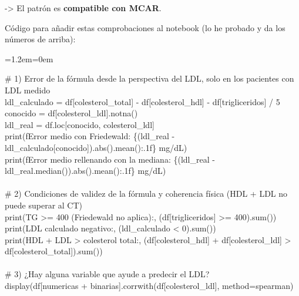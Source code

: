 \documentclass[11pt,a4paper]{article}
\newenvironment{codigo}
  {\par\smallskip\begin{list}{}{\leftmargin=1.2em\rightmargin=0em}\item\relax\ttfamily\scriptsize\raggedright}
  {\end{list}\smallskip}
\begin{document}
{   -\textgreater{} El patrón es \textbf{compatible con MCAR}.

Código para añadir estas comprobaciones al notebook (lo he probado y da los números de arriba):

\begin{codigo}
\# 1) Error de la fórmula desde la perspectiva del LDL, solo en los pacientes con LDL medido \\{}
ldl\_\allowbreak{}calculado = df[\textquotedbl{}colesterol\_\allowbreak{}total\textquotedbl{}] - df[\textquotedbl{}colesterol\_\allowbreak{}hdl\textquotedbl{}] - df[\textquotedbl{}trigliceridos\textquotedbl{}] /\allowbreak{} 5 \\{}
conocido = df[\textquotedbl{}colesterol\_\allowbreak{}ldl\textquotedbl{}].notna() \\{}
ldl\_\allowbreak{}real = df.loc[conocido, \textquotedbl{}colesterol\_\allowbreak{}ldl\textquotedbl{}] \\{}
print(f\textquotedbl{}Error medio con Friedewald: \{(ldl\_\allowbreak{}real - ldl\_\allowbreak{}calculado[conocido]).abs().mean():.1f\} mg/\allowbreak{}dL\textquotedbl{}) \\{}
print(f\textquotedbl{}Error medio rellenando con la mediana: \{(ldl\_\allowbreak{}real - ldl\_\allowbreak{}real.median()).abs().mean():.1f\} mg/\allowbreak{}dL\textquotedbl{}) \\{}
\mbox{} \\{}
\# 2) Condiciones de validez de la fórmula y coherencia física (HDL + LDL no puede superar al CT) \\{}
print(\textquotedbl{}TG \textgreater{}= 400 (Friedewald no aplica):\textquotedbl{}, (df[\textquotedbl{}trigliceridos\textquotedbl{}] \textgreater{}= 400).sum()) \\{}
print(\textquotedbl{}LDL calculado negativo:\textquotedbl{}, (ldl\_\allowbreak{}calculado \textless{} 0).sum()) \\{}
print(\textquotedbl{}HDL + LDL \textgreater{} colesterol total:\textquotedbl{}, (df[\textquotedbl{}colesterol\_\allowbreak{}hdl\textquotedbl{}] + df[\textquotedbl{}colesterol\_\allowbreak{}ldl\textquotedbl{}] \textgreater{} df[\textquotedbl{}colesterol\_\allowbreak{}total\textquotedbl{}]).sum()) \\{}
\mbox{} \\{}
\# 3) ¿Hay alguna variable que ayude a predecir el LDL? \\{}
display(df[numericas + binarias].corrwith(df[\textquotedbl{}colesterol\_\allowbreak{}ldl\textquotedbl{}], method=\textquotedbl{}spearman\textquotedbl{}) \\{}

\end{codigo}}
\end{document}
